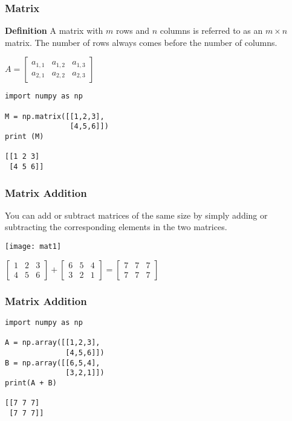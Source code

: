   \begin{frame}[fragile]\frametitle{Matrix}
\textbf{Definition}
A matrix with $m$ rows and $n$ columns is referred to as an $m \times n$ matrix.
The number of rows always comes before the number of columns.

$A = \begin{bmatrix}
  a_{1,1} & a_{1,2} & a_{1,3} \\
  a_{2,1} & a_{2,2} & a_{2,3}
 \end{bmatrix}$
 
\begin{lstlisting}
import numpy as np

M = np.matrix([[1,2,3],
               [4,5,6]])
print (M)

[[1 2 3]
 [4 5 6]] 
\end{lstlisting}


\end{frame}


 \begin{frame}[fragile] \frametitle{Matrix Addition}
 You can
add or subtract matrices of the same size by simply adding or subtracting the
corresponding elements in the two matrices. 

\begin{center}
\texttt{[image: mat1]}
\end{center}

$\begin{bmatrix}1 & 2 & 3 \\4 & 5 & 6\end{bmatrix}+ \begin{bmatrix}6 & 5 & 4 \\3 & 2 & 1\end{bmatrix} = \begin{bmatrix}7 & 7 & 7 \\7 & 7 & 7\end{bmatrix}$
\end{frame}

  \begin{frame}[fragile]\frametitle{Matrix Addition}
 
\begin{lstlisting}
import numpy as np

A = np.array([[1,2,3],
              [4,5,6]])
B = np.array([[6,5,4],
              [3,2,1]])
print(A + B)

[[7 7 7]
 [7 7 7]]
\end{lstlisting}

\end{frame}

